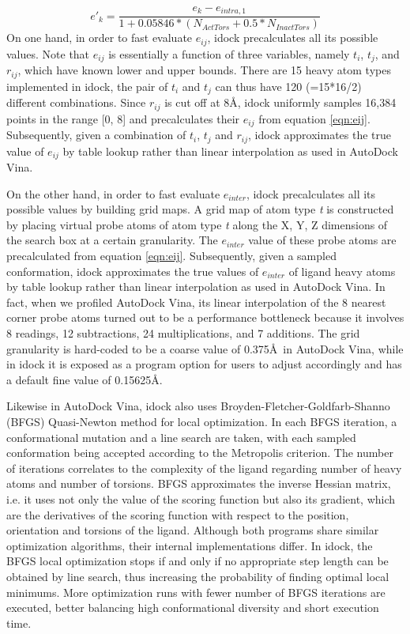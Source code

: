 \documentclass[10pt]{article}
\begin{document}
\begin{equation}
\label{eqn:FlexibilityPenalty}
e'_k = \frac{e_k - e_{intra,1}}{1 + 0.05846 * (N_{ActTors} + 0.5 * N_{InactTors})}
\end{equation}
On one hand, in order to fast evaluate $e_{ij}$, idock precalculates all its possible values. Note that $e_{ij}$ is essentially a function of three variables, namely $t_i$, $t_j$, and $r_{ij}$, which have known lower and upper bounds. There are 15 heavy atom types implemented in idock, the pair of $t_i$ and $t_j$ can thus have 120 (=15*16/2) different combinations. Since $r_{ij}$ is cut off at 8\AA, idock uniformly samples 16,384 points in the range [0, 8] and precalculates their $e_{ij}$ from equation \eqref{eqn:eij}. Subsequently, given a combination of $t_i$, $t_j$ and $r_{ij}$, idock approximates the true value of $e_{ij}$ by table lookup rather than linear interpolation as used in AutoDock Vina.

On the other hand, in order to fast evaluate $e_{inter}$, idock precalculates all its possible values by building grid maps. A grid map of atom type \textit{t} is constructed by placing virtual probe atoms of atom type \textit{t} along the X, Y, Z dimensions of the search box at a certain granularity. The $e_{inter}$ value of these probe atoms are precalculated from equation \eqref{eqn:eij}. Subsequently, given a sampled conformation, idock approximates the true values of $e_{inter}$ of ligand heavy atoms by table lookup rather than linear interpolation as used in AutoDock Vina. In fact, when we profiled AutoDock Vina, its linear interpolation of the 8 nearest corner probe atoms turned out to be a performance bottleneck because it involves 8 readings, 12 subtractions, 24 multiplications, and 7 additions. The grid granularity is hard-coded to be a coarse value of 0.375\AA\ in AutoDock Vina, while in idock it is exposed as a program option for users to adjust accordingly and has a default fine value of 0.15625\AA.

Likewise in AutoDock Vina, idock also uses Broyden-Fletcher-Goldfarb-Shanno (BFGS) \cite{786} Quasi-Newton method for local optimization. In each BFGS iteration, a conformational mutation and a line search are taken, with each sampled conformation being accepted according to the Metropolis criterion. The number of iterations correlates to the complexity of the ligand regarding number of heavy atoms and number of torsions. BFGS approximates the inverse Hessian matrix, i.e. it uses not only the value of the scoring function but also its gradient, which are the derivatives of the scoring function with respect to the position, orientation and torsions of the ligand. Although both programs share similar optimization algorithms, their internal implementations differ. In idock, the BFGS local optimization stops if and only if no appropriate step length can be obtained by line search, thus increasing the probability of finding optimal local minimums. More optimization runs with fewer number of BFGS iterations are executed, better balancing high conformational diversity and short execution time.
\end{document}
